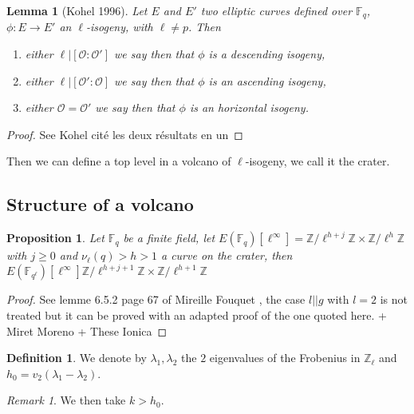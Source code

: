 \documentclass{article}
\theoremstyle{plain}
\newtheorem{lem}[thm]{Lemma}
\newtheorem{prop}[thm]{Proposition}
\theoremstyle{definition}
\newtheorem{defi}[thm]{Definition}
\theoremstyle{remark}
\newtheorem{rem}[thm]{Remark}
\begin{document}
\begin{lem}[Kohel 1996]
Let $E$ and $E'$ two elliptic curves defined over $\mathbb{F}_q$, $\phi :E \rightarrow E'$ an $\ell$-isogeny, with $\ell \neq p$. Then
\begin{enumerate}
\item either $\ell|[\mathcal{O} : \mathcal{O}']$ we say then that $\phi$ is a descending isogeny,
\item either $\ell|[\mathcal{O}':\mathcal{O}]$ we say then that $\phi$ is an ascending isogeny,
\item either $\mathcal{O}=\mathcal{O}'$ we say then that $\phi$ is an horizontal isogeny.
\end{enumerate}
\end{lem}

\begin{proof}
See Kohel cité les deux résultats en un
\end{proof}

Then we can define a top level in a volcano of $\ell$-isogeny, we call it the crater.


\subsection{Structure of a volcano}

\begin{prop} \label{structelevation}
Let $\mathbb{F}_q$ be a finite field, let $E(\mathbb{F}_q)[\ell^{\infty}]=\mathbb{Z}/\ell^{h+j}\mathbb{Z} \times \mathbb{Z}/\ell^{h}\mathbb{Z}$ with $ j \geqslant 0$ and $\nu_\ell(q)>h>1$ a curve on the crater, then $E(\mathbb{F}_{q^\ell})[\ell^{\infty}]  \mathbb{Z}/\ell^{h+j+1}\mathbb{Z} \times \mathbb{Z}/\ell^{h+1}\mathbb{Z}$
\end{prop}

\begin{proof}
See lemme 6.5.2 page 67  of Mireille Fouquet \cite{Fouquet01}, the case $l ||g$ with $l=2$ is not treated but it can be proved with an adapted proof of the one quoted here. + Miret Moreno + These Ionica
\end{proof}

\begin{defi}
We denote by $\lambda_1 , \lambda_2$ the $2$ eigenvalues of the Frobenius in $\mathbb{Z}_\ell$ and $h_0=v_2(\lambda_1-\lambda_2)$. 
\end{defi}

\begin{rem}
We then take $k>h_0$.  
\end{rem}
\end{document}
